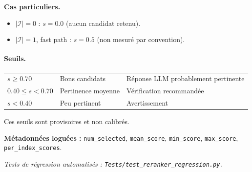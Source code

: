 \textbf{Cas particuliers.}
\begin{itemize}
  \item $|\mathcal{I}| = 0$ : $s = 0.0$ (aucun candidat retenu).
  \item $|\mathcal{I}| = 1$, fast path : $s = 0.5$ (non mesuré par convention).
\end{itemize}

\paragraph{Seuils.}

\begin{center}
\begin{tabular}{lll}
\toprule
$s \geq 0.70$ & Bons candidats & Réponse LLM probablement pertinente \\
$0.40 \leq s < 0.70$ & Pertinence moyenne & Vérification recommandée \\
$s < 0.40$ & Peu pertinent & Avertissement \\
\bottomrule
\end{tabular}
\end{center}

\noindent Ces seuils sont provisoires et non calibrés.

\textbf{Métadonnées loguées :} \texttt{num\_selected}, \texttt{mean\_score},
\texttt{min\_score}, \texttt{max\_score}, \texttt{per\_index\_scores}.


\noindent\textit{Tests de régression automatisés :
\texttt{Tests/test\_reranker\_regression.py}.}
